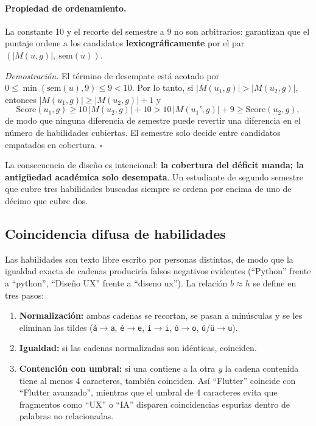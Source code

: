 \documentclass[12pt,a4paper]{article}
\begin{document}
\paragraph{Propiedad de ordenamiento.} La constante 10 y el recorte del semestre a 9 no son arbitrarios: garantizan que el puntaje ordene a los candidatos \textbf{lexicográficamente} por el par $(|M(u,g)|,\ \mathrm{sem}(u))$.

\emph{Demostración.} El término de desempate está acotado por $0 \le \min(\mathrm{sem}(u),9) \le 9 < 10$. Por lo tanto, si $|M(u_1,g)| > |M(u_2,g)|$, entonces $|M(u_1,g)| \ge |M(u_2,g)| + 1$ y
\[
\mathrm{Score}(u_1,g) \ge 10\,|M(u_2,g)| + 10 > 10\,|M(u_1',g)| + 9 \ge \mathrm{Score}(u_2,g),
\]
de modo que ninguna diferencia de semestre puede revertir una diferencia en el número de habilidades cubiertas. El semestre solo decide entre candidatos empatados en cobertura. $\square$

La consecuencia de diseño es intencional: \textbf{la cobertura del déficit manda; la antigüedad académica solo desempata}. Un estudiante de segundo semestre que cubre tres habilidades buscadas siempre se ordena por encima de uno de décimo que cubre dos.

\subsection{Coincidencia difusa de habilidades}
\label{sec:coincidencia}
Las habilidades son texto libre escrito por personas distintas, de modo que la igualdad exacta de cadenas produciría falsos negativos evidentes (``Python'' frente a ``python'', ``Diseño UX'' frente a ``diseno ux''). La relación $b \approx h$ se define en tres pasos:

\begin{enumerate}
    \item \textbf{Normalización:} ambas cadenas se recortan, se pasan a minúsculas y se les eliminan las tildes (\texttt{á}$\to$\texttt{a}, \texttt{é}$\to$\texttt{e}, \texttt{í}$\to$\texttt{i}, \texttt{ó}$\to$\texttt{o}, \texttt{ú}/\texttt{ü}$\to$\texttt{u}).
    \item \textbf{Igualdad:} si las cadenas normalizadas son idénticas, coinciden.
    \item \textbf{Contención con umbral:} si una contiene a la otra \emph{y} la cadena contenida tiene al menos 4 caracteres, también coinciden. Así ``Flutter'' coincide con ``Flutter avanzado'', mientras que el umbral de 4 caracteres evita que fragmentos como ``UX'' o ``IA'' disparen coincidencias espurias dentro de palabras no relacionadas.
\end{enumerate}
\end{document}
